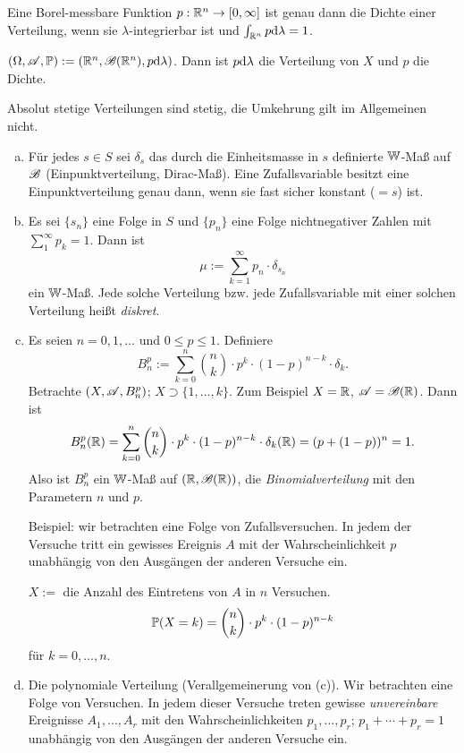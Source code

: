 \begin{rmrk*}
  Eine Borel-messbare Funktion $p : \mathbb{R}^n \to [0,\infty]$ ist genau dann die
  Dichte einer Verteilung, wenn sie $\lambda$-integrierbar ist und
  $\int_{\mathbb{R}^n} p \mathrm{d} \lambda = 1$.

  $(\Omega, \mathscr{A}, \mathbb{P}) := (\mathbb{R}^n, \mathscr{B}(\mathbb{R}^n), p \mathrm{d} \lambda)$. Dann
  ist $p \mathrm{d} \lambda$ die Verteilung von $X$ und $p$ die Dichte.

  Absolut stetige Verteilungen sind stetig, die Umkehrung gilt im Allgemeinen
  nicht.
\end{rmrk*}

\begin{exmp}
  \begin{enumerate}[(a)]
  \item Für jedes $s \in S$ sei $\delta_s$ das durch die Einheitsmasse in $s$
    definierte $\mathbb{W}$-Maß auf $\mathscr{B}$ (Einpunktverteilung, Dirac-Maß). Eine
    Zufallsvariable besitzt eine Einpunktverteilung genau dann, wenn sie fast
    sicher konstant ($=s$) ist.
  \item Es sei $\{ s_n \}$ eine Folge in $S$ und $\{ p_n \}$ eine Folge
    nichtnegativer Zahlen mit $\sum_1^\infty p_k = 1$. Dann ist
    \[ \mu := \sum_{k=1}^\infty p_n \cdot \delta_{s_n} \]
    ein $\mathbb{W}$-Maß. Jede solche Verteilung bzw. jede Zufallsvariable
    mit einer solchen Verteilung heißt \emph{diskret}.
  \item Es seien $n = 0, 1, \ldots$ und $0 \le p \le 1$. Definiere
    \[ B_n^p := \sum_{k=0}^n \binom{n}{k} \cdot p^k \cdot (1-p)^{n-k} \cdot
      \delta_k. \]
    Betrachte $(X, \mathscr{A}, B_n^p)$; $X \supset \{1, \ldots, k\}$. Zum Beispiel $X =
    \mathbb{R}$, $\mathscr{A} = \mathscr{B}(\mathbb{R})$. Dann ist
    \[ B_n^p(\mathbb{R}) = \sum_{k=0}^n \binom{n}{k} \cdot p^k \cdot (1-p)^{n-k} \cdot
      \delta_k(\mathbb{R}) = (p+(1-p))^n = 1. \]
    Also ist $B_n^p$ ein $\mathbb{W}$-Maß auf $(\mathbb{R}, \mathscr{B}(\mathbb{R}))$, die
    \emph{Binomialverteilung} mit den Parametern $n$ und $p$.

    Beispiel: wir betrachten eine Folge von Zufallsversuchen. In jedem der
    Versuche tritt ein gewisses Ereignis $A$ mit der Wahrscheinlichkeit $p$
    unabhängig von den Ausgängen der anderen Versuche ein.

    $X :=$ die Anzahl des Eintretens von $A$ in $n$ Versuchen.
    \[ \mathbb{P}( X = k) = \binom{n}{k} \cdot p^k \cdot (1-p)^{n-k} \]
    für $k = 0, \ldots, n$.
  \item Die polynomiale Verteilung (Verallgemeinerung von (c)). Wir betrachten
    eine Folge von Versuchen. In jedem dieser Versuche treten gewisse
    \emph{unvereinbare} Ereignisse $A_1, \ldots, A_r$ mit den
    Wahrscheinlichkeiten $p_1, \ldots, p_r$; $p_1 + \cdots + p_r = 1$ unabhängig
    von den Ausgängen der anderen Versuche ein.


\end{enumerate}
\end{exmp}
